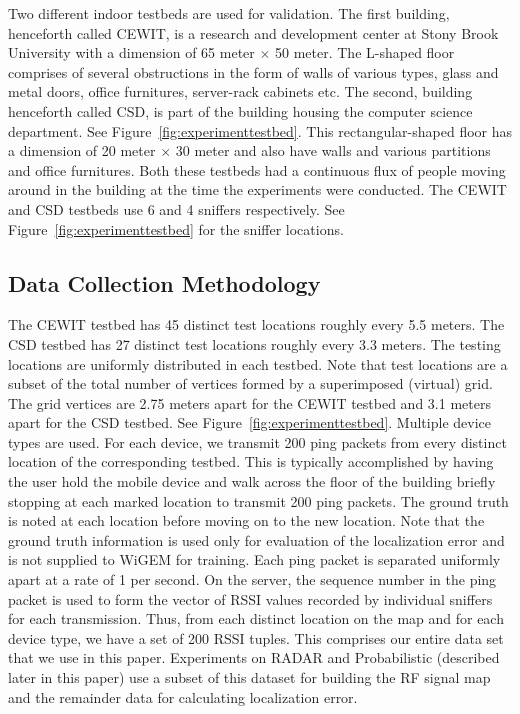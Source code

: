 Two different indoor testbeds are used for validation. The first building, henceforth called CEWIT, is a research and development center at Stony Brook University with a dimension of 65 meter $\times$ 50  meter. The L-shaped floor comprises of several obstructions in the form of walls of various types, glass and metal doors, office furnitures, server-rack cabinets etc. The second, building henceforth called CSD, is part of the building housing the computer science department. See Figure~\ref{fig:experimenttestbed}. This rectangular-shaped floor has a dimension of 20 meter $\times$ 30 meter and also have walls and various partitions and office furnitures. Both these testbeds had a continuous flux of people moving around in the building at the time
the experiments were conducted. The CEWIT and CSD testbeds use 6 and 4 sniffers respectively. 
See Figure~\ref{fig:experimenttestbed} for the sniffer locations. 

\subsection{Data Collection Methodology}
\label{subsec:datacollectionmethodology}

{\color{red} The CEWIT testbed has 45 distinct test locations roughly every 5.5 meters. The CSD testbed has 27 distinct test locations roughly every 3.3 meters. The testing locations are uniformly distributed in each testbed. Note that test locations are a subset of the total number of vertices formed by a superimposed (virtual) grid. The grid vertices are 2.75 meters apart for the CEWIT testbed and 3.1 meters apart for the CSD testbed.} See Figure~\ref{fig:experimenttestbed}. Multiple device types are used. For each device, we transmit 200 ping packets from every distinct location of the corresponding testbed. This is typically accomplished by having 
the user hold the mobile device and walk across the floor of the building briefly stopping at each marked location to transmit 200 ping packets. The ground truth is noted at each location before moving on to the new location. Note that the ground truth information is used only for evaluation of the localization error and is not supplied to WiGEM for training. Each ping packet is separated uniformly apart at a rate of 1 per second. On the server, the sequence number in the ping packet is used to form the vector of RSSI values recorded by individual sniffers for each transmission. Thus, from each distinct location on the map and for each device type, we have a set of 200 RSSI tuples. This comprises our entire data set that we use in this paper. Experiments on RADAR and Probabilistic (described later in this paper) use a subset of this dataset for building the RF signal map and the remainder data for calculating localization error. 

